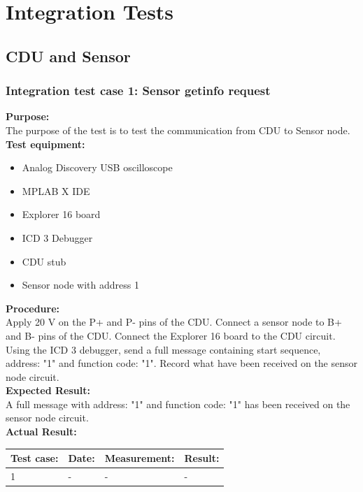 \chapter{Integration Tests}

\section{CDU and Sensor}
\subsection{Integration test case 1: Sensor getinfo request}
\textbf{Purpose:}\\
The purpose of the test is to test the communication from CDU to Sensor node.\\

\textbf{Test equipment:}
\begin{itemize}
\item Analog Discovery USB oscilloscope
\item MPLAB X IDE
\item Explorer 16 board
\item ICD 3 Debugger
\item CDU stub
\item Sensor node with address 1
\end{itemize}

\textbf{Procedure:}\\
Apply 20 V on the P+ and P- pins of the CDU. Connect a sensor node to B+ and B- pins of the CDU. Connect the Explorer 16 board to the CDU circuit. Using the ICD 3 debugger, send a full message containing start sequence, address: "1" and function code: "1". Record what have been received on the sensor node circuit.\\

\textbf{Expected Result:}\\
A full message with address: "1" and function code: "1" has been received on the sensor node circuit.\\

\textbf{Actual Result:}\\
\begin{table}[H]
\centering
\begin{tabular}{|p{2cm}|p{2cm}|p{3cm}|p{2cm}|}\hline
\textbf{Test case:} & \textbf{Date:} & \textbf{Measurement:} & \textbf{Result:} \\ \hline
1 & - & - & - \\ \hline
\end{tabular}
\end{table}

